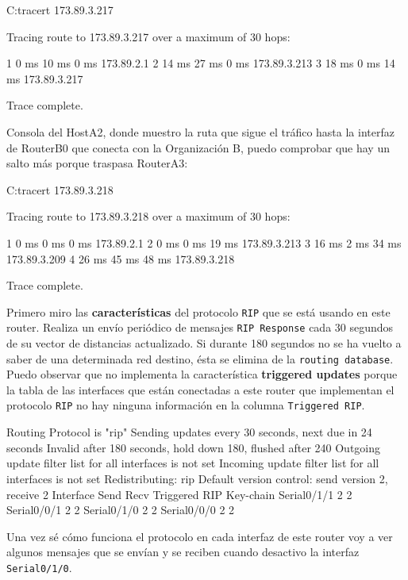 \begin{listing}[style=consola]
C:\>tracert 173.89.3.217

Tracing route to 173.89.3.217 over a maximum of 30 hops: 

  1   0 ms      10 ms     0 ms      173.89.2.1
  2   14 ms     27 ms     0 ms      173.89.3.213
  3   18 ms     0 ms      14 ms     173.89.3.217

Trace complete.
\end{listing}
\par Consola del HostA2, donde muestro la ruta que sigue el tráfico hasta la interfaz de RouterB0 que conecta con la Organización B, puedo comprobar que hay un salto más porque traspasa RouterA3:
\begin{listing}[style=consola]
C:\>tracert 173.89.3.218

Tracing route to 173.89.3.218 over a maximum of 30 hops: 

  1   0 ms      0 ms      0 ms      173.89.2.1
  2   0 ms      0 ms      19 ms     173.89.3.213
  3   16 ms     2 ms      34 ms     173.89.3.209
  4   26 ms     45 ms     48 ms     173.89.3.218

Trace complete.
\end{listing} 
\par Primero miro las \textbf{características} del protocolo \texttt{RIP} que se está usando en este router. Realiza un envío periódico de mensajes \texttt{RIP Response} cada 30 segundos de su vector de distancias actualizado. Si durante 180 segundos no se ha vuelto a saber de una determinada red destino, ésta se elimina de la \texttt{routing database}. Puedo observar que no implementa la característica \textbf{triggered updates} porque la tabla de las interfaces que están conectadas a este router que implementan el protocolo \texttt{RIP} no hay ninguna información en la columna \texttt{Triggered RIP}.
\begin{listing}[style=consola]
Routing Protocol is "rip"
Sending updates every 30 seconds, next due in 24 seconds
Invalid after 180 seconds, hold down 180, flushed after 240
Outgoing update filter list for all interfaces is not set
Incoming update filter list for all interfaces is not set
Redistributing: rip
Default version control: send version 2, receive 2
  Interface             Send  Recv  Triggered RIP  Key-chain
  Serial0/1/1           2     2     
  Serial0/0/1           2     2     
  Serial0/1/0           2     2     
  Serial0/0/0           2     2
\end{listing}
\par Una vez sé cómo funciona el protocolo en cada interfaz de este router voy a ver algunos mensajes que se envían y se reciben cuando desactivo la interfaz \texttt{Serial0/1/0}.
